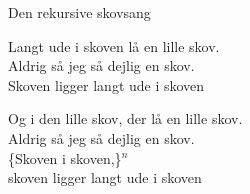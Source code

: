 \begin{song}{Den rekursive skovsang}
  {} %
  {\SBOrgMel} %
  {} %
  {} %
  {\NotCCLIed} %

  \begin{SBVerse}
    Langt ude i skoven lå en lille skov.\\
    Aldrig så jeg så dejlig en skov.\\
    Skoven ligger langt ude i skoven
  \end{SBVerse}
  \renewcommand{\theSBVerseCnt}{$n>0$}
  
  \begin{SBVerse}
    Og i den lille skov, der lå en lille skov.\\
    Aldrig så jeg så dejlig en skov.\\
    \{Skoven i skoven,\}$^{n}$\\
    skoven ligger langt ude i skoven
  \end{SBVerse}
\end{song}